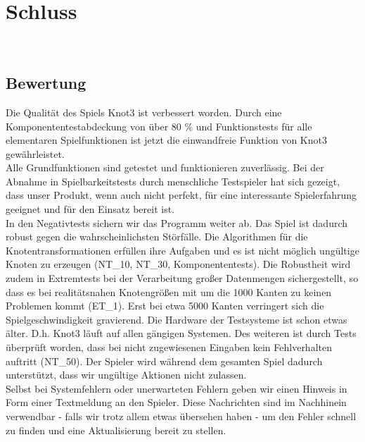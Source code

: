 %



\chapter{Schluss}
\label{Kapitel:Abschluss}

~\\



\section{Bewertung}
\label{Abschnitt:Abschluss:Bewertung}

Die Qualität des Spiels Knot3 ist verbessert worden. Durch eine Komponententestabdeckung von über 80 \% und Funktionstests für alle elementaren Spielfunktionen ist jetzt die einwandfreie Funktion von Knot3 gewährleistet.\\

Alle Grundfunktionen sind getestet und funktionieren zuverlässig. Bei der Abnahme in Spielbarkeitstests durch menschliche Testspieler hat sich gezeigt, dass unser Produkt, wenn auch nicht perfekt, für eine interessante Spielerfahrung geeignet und für den Einsatz bereit ist.\\

In den Negativtests sichern wir das Programm weiter ab. Das Spiel ist dadurch robust gegen die wahrscheinlichsten Störfälle. Die Algorithmen für die Knotentransformationen erfüllen ihre Aufgaben und es ist nicht möglich ungültige Knoten zu erzeugen (NT\_10, NT\_30, Komponententests). Die Robustheit wird zudem in Extremtests bei der Verarbeitung großer Datenmengen sichergestellt, so dass es bei realitätsnahen Knotengrößen mit um die 1000 Kanten zu keinen Problemen kommt (ET\_1). Erst bei etwa 5000 Kanten verringert sich die Spielgeschwindigkeit gravierend. Die Hardware der Testsysteme ist schon etwas älter. D.h. Knot3 läuft auf allen gängigen Systemen. Des weiteren ist durch Tests überprüft worden, dass bei nicht zugewiesenen Eingaben kein Fehlverhalten auftritt (NT\_50). Der Spieler wird während dem gesamten Spiel dadurch unterstützt, dass wir ungültige Aktionen nicht zulassen.\\

Selbst bei Systemfehlern oder unerwarteten Fehlern geben wir einen Hinweis in Form einer Textmeldung an den Spieler. Diese Nachrichten sind im Nachhinein verwendbar - falls wir trotz allem etwas übersehen haben - um den Fehler schnell zu finden und eine Aktualisierung bereit zu stellen.\\

